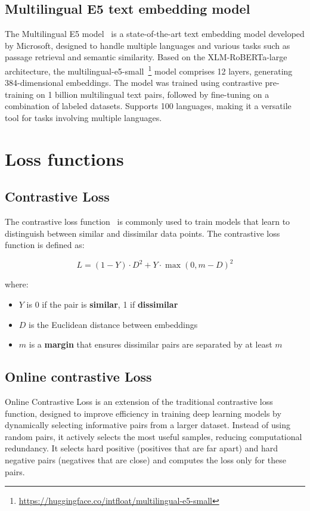\documentclass[
	a4paper, %
	10pt, %
	unnumberedsections, %
	twoside, %
]{LTJournalArticle}
\begin{document}
\subsection{Multilingual E5 text embedding model}
The Multilingual E5 model~\autocite{e5} is a state-of-the-art text embedding model developed by Microsoft, designed to handle multiple languages and various tasks such as passage retrieval and semantic similarity. Based on the XLM-RoBERTa-large architecture, the multilingual-e5-small~\footnote{\url{https://huggingface.co/intfloat/multilingual-e5-small}} model comprises 12 layers, generating 384-dimensional embeddings. The model was trained using contrastive pre-training on 1 billion multilingual text pairs, followed by fine-tuning on a combination of labeled datasets. Supports 100 languages, making it a versatile tool for tasks involving multiple languages.

\section{Loss functions}

\subsection{Contrastive Loss}
The contrastive loss function~\autocite{contrastive} is commonly used to train models that learn to distinguish between similar and dissimilar data points. The contrastive loss function is defined as:

\[
L = (1 - Y) \cdot D^2 + Y \cdot \max(0, m - D)^2
\]

where:
\begin{itemize}
    \item \( Y \) is 0 if the pair is \textbf{similar}, 1 if \textbf{dissimilar}
    \item \( D \) is the Euclidean distance between embeddings
    \item \( m \) is a \textbf{margin} that ensures dissimilar pairs are separated by at least \( m \)
\end{itemize}
\subsection{Online contrastive Loss}
Online Contrastive Loss is an extension of the traditional contrastive loss function, designed to improve efficiency in training deep learning models by dynamically selecting informative pairs from a larger dataset. Instead of using random pairs, it actively selects the most useful samples, reducing computational redundancy. It selects hard positive (positives that are far apart) and hard negative pairs (negatives that are close) and computes the loss only for these pairs.
\end{document}
